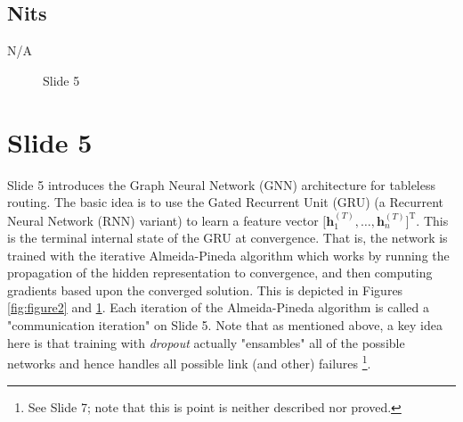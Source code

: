 \documentclass[11pt, oneside]{article}   	%
\begin{document}
\subsection{Nits}
\label{slide2:nits}
N/A


\begin{figure}[t]
\caption{Slide 5}
\label{fig:slide5}
\end{figure}


\section{Slide 5}
\label{sec:slide5}
Slide 5 introduces the Graph Neural Network (GNN) architecture \cite{Scarselli:2009:GNN:1657477.1657482,DBLP:conf/sigcomm/GeyerC18} for tableless routing. 
The basic idea is to use the  Gated Recurrent Unit (GRU) \cite{2017arXiv170105923D} (a Recurrent Neural Network (RNN) variant) to learn a feature vector 
$\Big [ \mathbf{h}^{(T)}_1,\hdots, \mathbf{h}^{(T)}_n \Big ]^\text{T}$. This is the terminal internal state of the GRU
at convergence. That is, the network is trained with the iterative  Almeida-Pineda algorithm \cite{PhysRevLett.59.2229} which works by running the propagation 
of the hidden representation to convergence, and then computing gradients based upon the converged solution. This is depicted in 
Figures  \ref{fig:figure2} and \ref{fig:slide5}. Each iteration of the Almeida-Pineda algorithm is called a "communication iteration" on Slide 5.
Note that as mentioned above, a key idea here is that  training with \emph{dropout} \cite{Srivastava:2014:DSW:2627435.2670313} actually "ensambles" all of 
the possible networks and hence handles all possible link (and other) failures \footnote{See Slide 7; note that this is point is neither described nor proved.}. 
\end{document}
